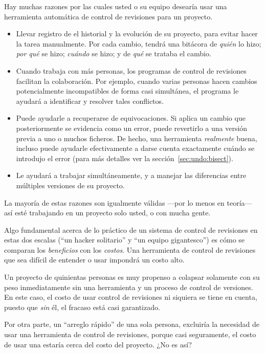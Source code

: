 Hay muchas razones por las cuales usted o su equipo desearía usar una
herramienta automática de control de revisiones para un proyecto.
\begin{itemize}
\item Llevar registro de el historial y la evolución de su proyecto, para
  evitar hacer la tarea manualmente. Por cada cambio, tendrá una
  bitácora de \emph{quién} lo hizo; \emph{por qué} se hizo;
  \emph{cuándo} se hizo; y de \emph{qué} se trataba el cambio.
\item Cuando trabaja con más personas, los programas de control de
  revisiones facilitan la colaboración.  Por ejemplo, cuando varias
  personas hacen cambios potencialmente incompatibles de forma casi
  simultánea, el programa le ayudará a identificar y resolver tales
  conflictos.
\item Puede ayudarle a recuperarse de equivocaciones. Si aplica un
  cambio que posteriormente se evidencia como un error, puede
  revertirlo a una versión previa a uno o muchos ficheros. De hecho,
  una herramienta \emph{realmente} buena, incluso puede ayudarle
  efectivamente a darse cuenta exactamente cuándo se introdujo el
  error (para más detalles ver la sección~\ref{sec:undo:bisect}).
\item Le ayudará a trabajar simultáneamente, y a manejar las diferencias
  entre múltiples versiones de su proyecto.
\end{itemize}
La mayoría de estas razones son igualmente válidas ---por lo menos en
teoría--- así esté trabajando en un proyecto solo usted, o con mucha gente.

Algo fundamental acerca de lo práctico de un sistema de control de
revisiones en estas dos escalas (``un hacker solitario'' y ``un equipo
gigantesco'') es cómo se comparan los \emph{beneficios} con los
\emph{costos}.  Una herramienta de control de revisiones que sea
difícil de entender o usar impondrá un costo alto.

Un proyecto de quinientas personas es muy propenso a colapsar
solamente con su peso inmediatamente sin una herramienta y un proceso
de control de versiones. En este caso, el costo de usar control de
revisiones ni siquiera se tiene en cuenta, puesto que \emph{sin} él,
el fracaso está casi garantizado.

Por otra parte, un ``arreglo rápido'' de una sola persona, excluiría
la necesidad de usar una herramienta de control de revisiones, porque
casi seguramente, el costo de usar una estaría cerca del costo del
proyecto. ¿No es así?

